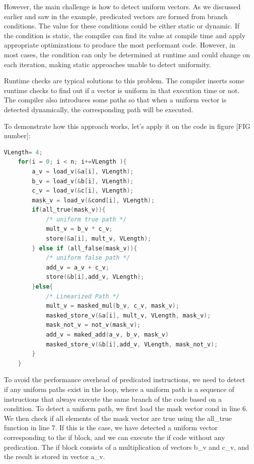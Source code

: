 \documentclass[\main/thesis.tex]{subfiles}
\begin{document}
However, the main challenge is how to detect uniform vectors. As we discussed earlier and saw in the example, predicated vectors are formed from branch conditions. The value for these conditions could be either static or dynamic. If the condition is static, the compiler can find its value at compile time and apply appropriate optimizations to produce the most performant code. However, in most cases, the condition can only be determined at runtime and could change on each iteration, making static approaches unable to detect uniformity.

Runtime checks are typical solutions to this problem. The compiler inserts some runtime checks to find out if a vector is uniform in that execution time or not. The compiler also introduces some paths so that when a uniform vector is detected dynamically, the corresponding path will be executed.

To demonstrate how this approach works, let's apply it on the code in figure [FIG number]:

\begin{lstlisting}[language=C]
    VLength= 4;
    for(i = 0; i < n; i+=VLength ){
        a_v = load_v(&a[i], VLength);
        b_v = load_v(&b[i], VLength);
        c_v = load_v(&c[i], VLength);
        mask_v = load_v(&cond[i], VLength);
        if(all_true(mask_v)){
            /* uniform true path */
            mult_v = b_v * c_v;
            store(&a[i], mult_v, VLength);
        } else if (all_false(mask_v)){
            /* uniform false path */
            add_v = a_v + c_v;
            store(&b[i],add_v, VLength);
        }else{
            /* Linearized Path */
            mult_v = masked_mul(b_v, c_v, mask_v);
            masked_store_v(&a[i], mult_v, VLength, mask_v);
            mask_not_v = not_v(mask_v);
            add_v = maked_add(a_v, b_v, mask_v)
            masked_store_v(&b[i],add_v, VLength, mask_not_v);
        }
    }
\end{lstlisting}

To avoid the performance overhead of predicated instructions, we need to detect if any uniform paths exist in the loop, where a uniform path is a sequence of instructions that always execute the same branch of the code based on a condition. To detect a uniform path, we first load the mask vector cond in line 6. We then check if all elements of the mask vector are true using the all\_true function in line 7. If this is the case, we have detected a uniform vector corresponding to the if block, and we can execute the if code without any predication. The if block consists of a multiplication of vectors b\_v and c\_v, and the result is stored in vector a\_v.
\end{document}
